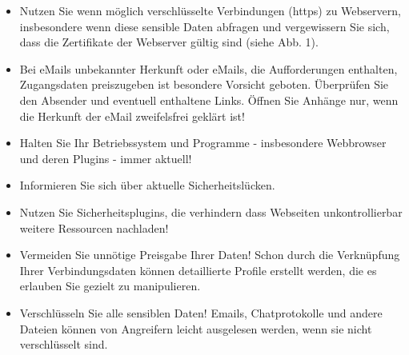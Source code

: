 \documentclass[10pt,foldmark,tumble]{leaflet}
\newcommand{\barcode}[1]{
\begin{pspicture}(1cm,1cm) 
\psbarcode[scalex=0.4,scaley=0.4]{#1}{}{qrcode} 
\end{pspicture}
}
\begin{document}
\begin{itemize}
 \item Nutzen Sie wenn möglich verschlüsselte Verbindungen (https) zu Webservern, insbesondere
 wenn diese sensible Daten abfragen und vergewissern Sie sich, dass die Zertifikate der Webserver
 gültig sind (siehe Abb. 1).
 
 \item Bei eMails unbekannter Herkunft oder eMails, die Aufforderungen enthalten, Zugangsdaten
 preiszugeben ist besondere Vorsicht geboten. Überprüfen Sie den Absender und eventuell enthaltene
 Links. Öffnen Sie Anhänge nur, wenn die Herkunft der eMail zweifelsfrei geklärt ist!
 
 \item Halten Sie Ihr Betriebssystem und Programme - insbesondere Webbrowser und deren Plugins - 
 immer aktuell!
 
 \item Informieren Sie sich über aktuelle Sicherheitslücken. 
 
 \item Nutzen Sie Sicherheitsplugins, die verhindern dass Webseiten unkontrollierbar weitere
 Ressourcen nachladen!

 \item Vermeiden Sie unnötige Preisgabe Ihrer Daten! Schon durch die Verknüpfung Ihrer 
 Verbindungsdaten können detaillierte Profile erstellt werden, die es erlauben Sie gezielt zu 
 manipulieren.

 \item Verschlüsseln Sie alle sensiblen Daten! Emails, Chatprotokolle und andere Dateien können
 von Angreifern leicht ausgelesen werden, wenn sie nicht verschlüsselt sind. 


\end{itemize}
\end{document}
